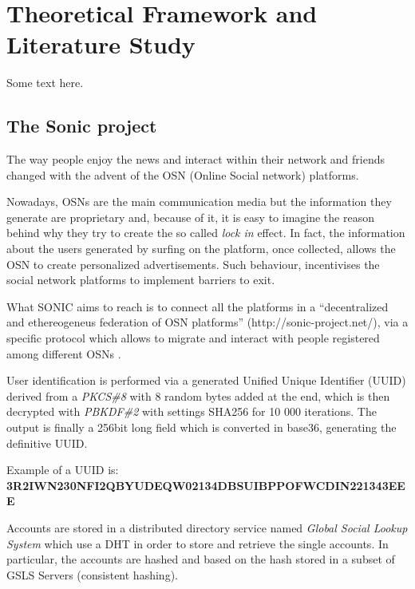 \section{Theoretical Framework and Literature Study}
\label{S:2}

Some text here.

\subsection{The Sonic project}

The way people enjoy the news and interact within their network and friends changed with the advent of the OSN (Online Social network) platforms. \par
Nowadays, OSNs are the main communication media but the information they generate are proprietary and, because of it, it is easy to imagine the reason behind why they try to create the so called \textit{lock in} effect.
In fact, the information about the users generated by surfing on the platform, once collected, allows the OSN to create personalized advertisements. Such behaviour, incentivises the social network platforms to implement barriers to exit. \par
What SONIC aims to reach is to connect all the platforms in a ``decentralized and ethereogeneus federation of OSN platforms'' (http://sonic-project.net/), via a specific protocol which allows to migrate and interact with people registered among different OSNs \cite{gondor_sonic:_2014}. \par
User identification is performed via a generated Unified Unique Identifier (UUID) derived from a \textit{PKCS\#8} \cite{pkcs8}with 8 random bytes added at the end, which is then decrypted with \textit{PBKDF\#2} \cite{pkcs8} with settings SHA256 \cite{hansen_us} for 10 000 iterations.
The output is finally a 256bit long field which is converted in base36, generating the definitive UUID. \par

Example of a UUID is: \\ \textbf{3R2IWN230NFI2QBYUDEQW02134DBSUIBPPOFWCDIN221343EEE} \par

Accounts are stored in a distributed directory service named \textit{Global Social Lookup System} which use a DHT in order to store and retrieve the single accounts. In particular, the accounts are hashed and based on the hash stored in a subset of GSLS Servers (consistent hashing). \par

